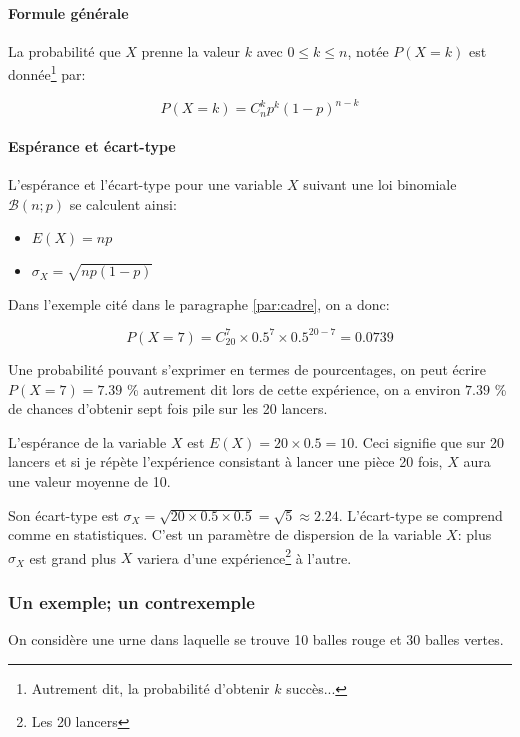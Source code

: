 \documentclass[a4paper,12pt]{scrartcl}
\begin{document}
\paragraph{Formule générale}
La probabilité que $X$ prenne la valeur $k$ avec $0 \leqslant k \leqslant n$, notée $P(X=k)$ est donnée\footnote{Autrement dit, la probabilité d'obtenir $k$ succès...} par:

\begin{equation}
 P(X=k) = C_n^k p^k (1-p)^{n-k}
\end{equation}

\paragraph{Espérance et écart-type}

L'espérance et l'écart-type pour une variable $X$ suivant une loi binomiale $\mathcal{B}(n;p)$ se calculent ainsi:

\begin{itemize}
 \item $E(X) = np$
 \item $\sigma_X = \sqrt{np(1-p)}$
\end{itemize}




Dans l'exemple cité dans le paragraphe \ref{par:cadre}, on a donc: 

$$P(X=7) = C^7_{20} \times 0.5^7 \times 0.5^{20-7} = 0.0739$$ 

Une probabilité pouvant s'exprimer en termes de pourcentages, on peut écrire $P(X=7) = 7.39$ \% autrement dit lors de cette expérience, on a environ $7.39$ \% de chances d'obtenir sept fois pile sur les 20 lancers.

L'espérance de la variable $X$ est $E(X) = 20 \times 0.5 = 10$. Ceci signifie que sur 20 lancers et si je répète l'expérience consistant à lancer une pièce 20 fois, $X$ aura une valeur moyenne de 10.

Son écart-type est $\sigma_X = \sqrt{20 \times 0.5 \times 0.5} = \sqrt{5} \approx 2.24$. L'écart-type se comprend comme en statistiques. C'est un paramètre de dispersion de la variable $X$: plus $\sigma_X$ est grand plus $X$ variera d'une expérience\footnote{Les 20 lancers} à l'autre.

\subsubsection{Un exemple; un contrexemple}

On considère une urne dans laquelle se trouve 10 balles rouge et 30 balles vertes.
\end{document}
